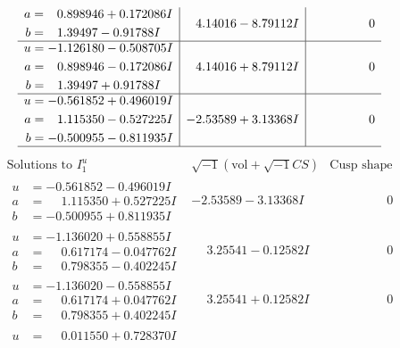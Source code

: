 \documentclass[1p]{elsarticle_modified}
\theoremstyle{definition}
\newcommand{\I}{\sqrt{-1}}
\begin{document}
$$\begin{array}{c|c|c}
\begin{aligned}
a &= \phantom{-}0.898946 + 0.172086 I \\
b &= \phantom{-}1.39497 - 0.91788 I\end{aligned}
 & \phantom{-}4.14016 - 8.79112 I & \phantom{-0.000000 } 0 \\ \hline\begin{aligned}
u &= -1.126180 - 0.508705 I \\
a &= \phantom{-}0.898946 - 0.172086 I \\
b &= \phantom{-}1.39497 + 0.91788 I\end{aligned}
 & \phantom{-}4.14016 + 8.79112 I & \phantom{-0.000000 } 0 \\ \hline\begin{aligned}
u &= -0.561852 + 0.496019 I \\
a &= \phantom{-}1.115350 - 0.527225 I \\
b &= -0.500955 - 0.811935 I\end{aligned}
 & -2.53589 + 3.13368 I & \phantom{-0.000000 } 0\\
 \hline 
 \end{array}$$\newpage$$\begin{array}{c|c|c}  
\text{Solutions to }I^u_{1}& \I (\text{vol} + \sqrt{-1}CS) & \text{Cusp shape}\\
 \hline 
\begin{aligned}
u &= -0.561852 - 0.496019 I \\
a &= \phantom{-}1.115350 + 0.527225 I \\
b &= -0.500955 + 0.811935 I\end{aligned}
 & -2.53589 - 3.13368 I & \phantom{-0.000000 } 0 \\ \hline\begin{aligned}
u &= -1.136020 + 0.558855 I \\
a &= \phantom{-}0.617174 - 0.047762 I \\
b &= \phantom{-}0.798355 - 0.402245 I\end{aligned}
 & \phantom{-}3.25541 - 0.12582 I & \phantom{-0.000000 } 0 \\ \hline\begin{aligned}
u &= -1.136020 - 0.558855 I \\
a &= \phantom{-}0.617174 + 0.047762 I \\
b &= \phantom{-}0.798355 + 0.402245 I\end{aligned}
 & \phantom{-}3.25541 + 0.12582 I & \phantom{-0.000000 } 0 \\ \hline\begin{aligned}
u &= \phantom{-}0.011550 + 0.728370 I \\

\end{aligned}
\end{array}$$
\end{document}
